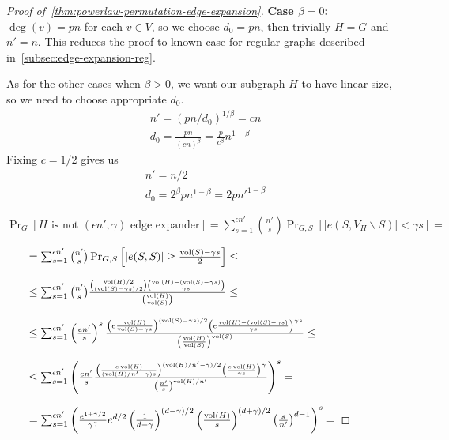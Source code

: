\begin{proof}[Proof of~\autoref{thm:powerlaw-permutation-edge-expansion}]
    \textbf{Case $\beta=0$:}
    $\deg(v)=pn$ for each $v\in V$, so we choose $d_0=pn$, then trivially $H=G$ and $n'=n$.
    This reduces the proof to known case for regular graphs described in~\autoref{subsec:edge-expansion-reg}.
    
    As for the other cases when $\beta>0$, we want our subgraph $H$ to have linear size, so we need to choose appropriate $d_0$.
    \begin{gather*}
        n'=(pn/d_0)^{1/\beta}=cn\\
        d_0=\frac{pn}{(cn)^\beta}=\frac{p}{c^\beta}n^{1-\beta}
    \end{gather*}
    Fixing $c=1/2$ gives us
    \begin{gather*}
        n'=n/2\\
        d_0=2^\beta pn^{1-\beta}=2pn'^{1-\beta}
    \end{gather*}
    
    $\Pr_G[H\text{ is not }(\epsilon n',\gamma)\text{ edge expander}]
    =\sum_{s=1}^{\epsilon n'}{
        \binom{n'}{s}
        \Pr_{G,S}[|e(S,V_H\backslash S)| < \gamma s]
    }=$
    
    $\qquad=\sum_{s=1}^{\epsilon n'}{
        \binom{n'}{s}
        \Pr_{G,S}\left[|e(S,S)|\geq\frac{\operatorname*{vol}(S)-\gamma s}{2}\right]
    }\leq$
    
    $\qquad\leq\sum_{s=1}^{\epsilon n'}{
        \binom{n'}{s}
        \frac{\binom{\operatorname*{vol}(H)/2}{(\operatorname*{vol}(S)-\gamma s)/2}\binom{\operatorname*{vol}(H)-(\operatorname*{vol}(S)-\gamma s)}{\gamma s}}{\binom{\operatorname*{vol}(H)}{\operatorname*{vol}(S)}}
    }\leq$
    
    $\qquad\leq\sum_{s=1}^{\epsilon n'}{
        \left(\frac{en'}{s}\right)^s
        \frac{
            \left(e\frac{\operatorname*{vol}(H)}{\operatorname*{vol}(S)-\gamma s}\right)^{(\operatorname*{vol}(S)-\gamma s)/2}
            \left(e\frac{\operatorname*{vol}(H)-(\operatorname*{vol}(S)-\gamma s)}{\gamma s}\right)^{\gamma s}
        }
        {\left(\frac{\operatorname*{vol}(H)}{\operatorname*{vol}(S)}\right)^{\operatorname*{vol}(S)}}
    }\leq$
    
    $\qquad\leq\sum_{s=1}^{\epsilon n'}{\left(
        \frac{en'}{s}
        \frac{
            \left(\frac{e\operatorname*{vol}(H)}{(\operatorname*{vol}(H)/n'-\gamma)s}\right)^{(\operatorname*{vol}(H)/n'-\gamma)/2}
            \left(\frac{e\operatorname*{vol}(H)}{\gamma s}\right)^{\gamma}
        }
        {\left(\frac{n'}{s}\right)^{\operatorname*{vol}(H)/n'}}
    \right)^s}=$

    $\qquad=\sum_{s=1}^{\epsilon n'}{\left(
        \frac{e^{1+\gamma/2}}{\gamma^\gamma}
        e^{d/2}
        \left(\frac{1}{d-\gamma}\right)^{(d-\gamma)/2}
        \left(\frac{\operatorname*{vol}(H)}{s}\right)^{(d+\gamma)/2}
        \left(\frac{s}{n'}\right)^{d-1}
    \right)^s}=$


\end{proof}

